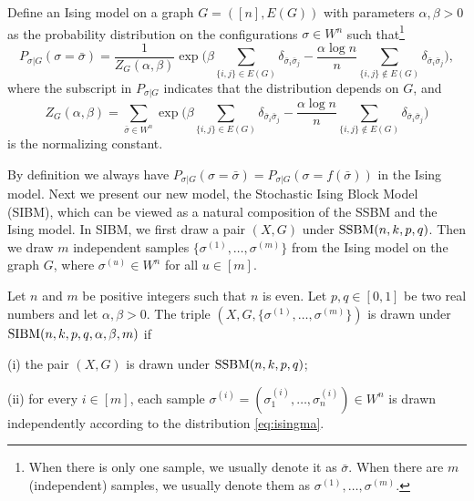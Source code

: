 \documentclass{article}
\begin{document}
 \begin{definition}
Define an Ising model on a graph $G=([n],E(G))$ with parameters $\alpha,\beta>0$ as the probability distribution on the configurations $\sigma\in W^n$ such that\footnote{When there is only one sample, we usually denote it as $\bar{\sigma}$. When there are $m$ (independent) samples, we usually denote them as $\sigma^{(1)},\dots,\sigma^{(m)}$.}
\begin{equation} \label{eq:isingma}
P_{\sigma|G}(\sigma=\bar{\sigma})=\frac{1}{Z_G(\alpha,\beta)}
\exp\Big(\beta\sum_{\{i,j\}\in E(G)} \delta_{\bar{\sigma}_i \bar{\sigma}_j}
-\frac{\alpha\log n}{n} \sum_{\{i,j\}\notin E(G)} \delta_{\bar{\sigma}_i \bar{\sigma}_j} \Big),
\end{equation}
where the subscript in $P_{\sigma|G}$ indicates that the distribution depends on $G$, and 
\begin{equation}  \label{eq:zg}
Z_G(\alpha,\beta)=\sum_{\bar{\sigma} \in W^n} \exp\Big(\beta\sum_{\{i,j\}\in E(G)}\delta_{\bar{\sigma}_i \bar{\sigma}_j} 
-\frac{\alpha\log n}{n} \sum_{\{i,j\}\notin E(G)} \delta_{\bar{\sigma}_i \bar{\sigma}_j}  \Big) 
\end{equation}
is the normalizing constant.
\end{definition}






By definition we always have $P_{\sigma|G}(\sigma=\bar{\sigma})=P_{\sigma|G}(\sigma=f(\bar{\sigma}))$ in the Ising model. Next we present our new model, the Stochastic Ising Block Model (SIBM), which can be viewed as a natural composition of the SSBM and the Ising model. In SIBM, we first draw a pair $(X,G)$ under $\operatorname{SSBM}(n,k, p,q)$.  Then we draw $m$ independent samples $\{\sigma^{(1)},\dots,\sigma^{(m)}\}$ from the Ising model on the graph $G$, where $\sigma^{(u)}\in W^n$ for all $u\in[m]$.

\begin{definition}
Let $n$ and $m$ be positive integers such that $n$ is even. Let $p,q\in[0,1]$ be two real numbers and let $\alpha,\beta>0$. The triple $(X,G,\{\sigma^{(1)},\dots,\sigma^{(m)}\})$ is drawn under $\operatorname{SIBM}(n,k, p,q,\alpha,\beta,m)$ if

\noindent
(i) the pair $(X,G)$ is drawn under $\operatorname{SSBM}(n,k, p,q)$;

\noindent
(ii) for every $i\in[m]$, each sample $\sigma^{(i)}=(\sigma_1^{(i)},\dots,\sigma_n^{(i)}) \in W^n$ is drawn independently according to the distribution \eqref{eq:isingma}.
\end{definition}
\end{document}
